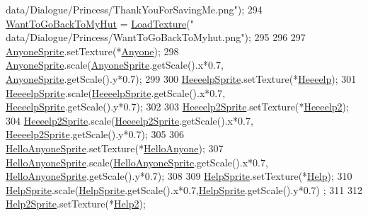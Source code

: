 \begin{DoxyCode}
{      data/Dialogue/Princess/ThankYouForSavingMe.png"});
294     \hyperlink{classDialogue_a481bca285652d05f9ce0a26a45647ffc}{WantToGoBackToMyHut} = \hyperlink{classDialogue_a3fb8644f167af142d1413c0fa6b74434}{LoadTexture}(\textcolor{stringliteral}{"
      data/Dialogue/Princess/WantToGoBackToMyhut.png"});
295 
296 
297     \hyperlink{classDialogue_a0c7cabd989d3b5afacfc0c277dd3967d}{AnyoneSprite}.setTexture(*\hyperlink{classDialogue_a003a8b11f40072e6146c86c0bb68b83d}{Anyone});
298     \hyperlink{classDialogue_a0c7cabd989d3b5afacfc0c277dd3967d}{AnyoneSprite}.scale(\hyperlink{classDialogue_a0c7cabd989d3b5afacfc0c277dd3967d}{AnyoneSprite}.getScale().x*0.7,
      \hyperlink{classDialogue_a0c7cabd989d3b5afacfc0c277dd3967d}{AnyoneSprite}.getScale().y*0.7);
299 
300     \hyperlink{classDialogue_aca454b4e5d23ecedd588615820a60179}{HeeeelpSprite}.setTexture(*\hyperlink{classDialogue_ae8a4d4f7a0a774ff022d6c81462befdf}{Heeeelp});
301     \hyperlink{classDialogue_aca454b4e5d23ecedd588615820a60179}{HeeeelpSprite}.scale(\hyperlink{classDialogue_aca454b4e5d23ecedd588615820a60179}{HeeeelpSprite}.getScale().x*0.7,
      \hyperlink{classDialogue_aca454b4e5d23ecedd588615820a60179}{HeeeelpSprite}.getScale().y*0.7);
302 
303     \hyperlink{classDialogue_a0ab086e2f989569384267e69b3ecc7a1}{Heeeelp2Sprite}.setTexture(*\hyperlink{classDialogue_a8811756244b8c9381b7cff4f42cf366e}{Heeeelp2});
304     \hyperlink{classDialogue_a0ab086e2f989569384267e69b3ecc7a1}{Heeeelp2Sprite}.scale(\hyperlink{classDialogue_a0ab086e2f989569384267e69b3ecc7a1}{Heeeelp2Sprite}.getScale().x*0.7,
      \hyperlink{classDialogue_a0ab086e2f989569384267e69b3ecc7a1}{Heeeelp2Sprite}.getScale().y*0.7);
305 
306     \hyperlink{classDialogue_ad8ea1a381a8dfbd9a20ea4987d119717}{HelloAnyoneSprite}.setTexture(*\hyperlink{classDialogue_a051f743479e3808099f49ee71498d8f1}{HelloAnyone});
307     \hyperlink{classDialogue_ad8ea1a381a8dfbd9a20ea4987d119717}{HelloAnyoneSprite}.scale(\hyperlink{classDialogue_ad8ea1a381a8dfbd9a20ea4987d119717}{HelloAnyoneSprite}.getScale().x*0.7,
      \hyperlink{classDialogue_ad8ea1a381a8dfbd9a20ea4987d119717}{HelloAnyoneSprite}.getScale().y*0.7);
308 
309     \hyperlink{classDialogue_a6d1fb2d167d8efe017e3a5aac0ffcdc6}{HelpSprite}.setTexture(*\hyperlink{classDialogue_a8b2703485db5802970e8acb6c9e83ef1}{Help});
310     \hyperlink{classDialogue_a6d1fb2d167d8efe017e3a5aac0ffcdc6}{HelpSprite}.scale(\hyperlink{classDialogue_a6d1fb2d167d8efe017e3a5aac0ffcdc6}{HelpSprite}.getScale().x*0.7,\hyperlink{classDialogue_a6d1fb2d167d8efe017e3a5aac0ffcdc6}{HelpSprite}.getScale().y*0.7)
      ;
311 
312     \hyperlink{classDialogue_aaab7a032364f62e4f39b0082fff4cd4d}{Help2Sprite}.setTexture(*\hyperlink{classDialogue_ade9692a24d728546bf23f015388bf21a}{Help2});

\end{DoxyCode}

